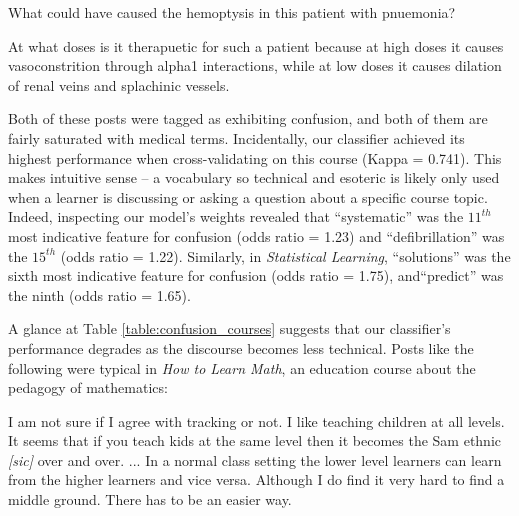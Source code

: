 \documentclass{edm_template}
\begin{document}
\vspace{-10pt}
\begin{displayquote}
What could have caused the hemoptysis in this patient with pnuemonia?
\end{displayquote}
\vspace{-10pt}

\vspace{-5pt}
\begin{displayquote}
At what doses is it therapuetic for such a patient because at high doses it causes vasoconstrition through alpha1 interactions, while at low doses it causes dilation of renal veins and splachinic vessels.
\end{displayquote}
\vspace{-10pt}

Both of these posts were tagged as exhibiting confusion, and both of them are fairly saturated with medical terms. Incidentally, our classifier achieved its highest performance when cross-validating on this course (Kappa = 0.741). This makes intuitive sense -- a vocabulary so technical and esoteric is likely only used when a learner is discussing or asking a question about a specific course topic. Indeed, inspecting our model's weights revealed that ``systematic'' was the $11^{th}$ most indicative feature for confusion (odds ratio = 1.23) and ``defibrillation'' was the $15^{th}$ (odds ratio = 1.22). Similarly, in \emph{Statistical Learning}, ``solutions'' was the sixth most indicative feature for confusion (odds ratio = 1.75), and``predict'' was the ninth (odds ratio = 1.65).

A glance at Table \ref{table:confusion_courses} suggests that our classifier's performance degrades as the discourse becomes less technical. Posts like the following were typical in \emph{How to Learn Math}, an education course about the pedagogy of mathematics:

\vspace{-10pt}
\begin{displayquote}
I am not sure if I agree with tracking or not.  I like teaching children at all levels.  It seems that if you teach kids at the same level then it becomes the Sam ethnic \emph{[sic]} over and over.  ...  In a normal class setting the lower level learners can learn from the higher learners and vice versa.  Although I do find it very hard to find a middle ground. There has to be an easier way.
\vspace{-10pt}
\end{displayquote}
\end{document}
